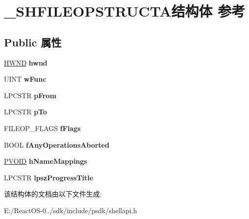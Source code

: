 \hypertarget{struct___s_h_f_i_l_e_o_p_s_t_r_u_c_t_a}{}\section{\+\_\+\+S\+H\+F\+I\+L\+E\+O\+P\+S\+T\+R\+U\+C\+T\+A结构体 参考}
\label{struct___s_h_f_i_l_e_o_p_s_t_r_u_c_t_a}
\subsection*{Public 属性}
\begin{DoxyCompactItemize}
\item 
\mbox{\label{struct___s_h_f_i_l_e_o_p_s_t_r_u_c_t_a_a41b6dc57bf84e71cfb875ce5ee901d2d}} 
\hyperlink{interfacevoid}{H\+W\+ND} {\bfseries hwnd}
\item 
\mbox{\label{struct___s_h_f_i_l_e_o_p_s_t_r_u_c_t_a_a8279a87684a461608231651724da2f92}} 
U\+I\+NT {\bfseries w\+Func}
\item 
\mbox{\label{struct___s_h_f_i_l_e_o_p_s_t_r_u_c_t_a_afe30a539d61ab33c50efc5815a92849d}} 
L\+P\+C\+S\+TR {\bfseries p\+From}
\item 
\mbox{\label{struct___s_h_f_i_l_e_o_p_s_t_r_u_c_t_a_abe74fd5f7b34398e26954e990dda5da2}} 
L\+P\+C\+S\+TR {\bfseries p\+To}
\item 
\mbox{\label{struct___s_h_f_i_l_e_o_p_s_t_r_u_c_t_a_ae027c5e4be79dca95ca7e70e78497312}} 
F\+I\+L\+E\+O\+P\+\_\+\+F\+L\+A\+GS {\bfseries f\+Flags}
\item 
\mbox{\label{struct___s_h_f_i_l_e_o_p_s_t_r_u_c_t_a_af7e413de77047a357d767140b7cc74d4}} 
B\+O\+OL {\bfseries f\+Any\+Operations\+Aborted}
\item 
\mbox{\label{struct___s_h_f_i_l_e_o_p_s_t_r_u_c_t_a_a2a6fa2c7f5a1b2b0cfba16999b72ba05}} 
\hyperlink{interfacevoid}{P\+V\+O\+ID} {\bfseries h\+Name\+Mappings}
\item 
\mbox{\label{struct___s_h_f_i_l_e_o_p_s_t_r_u_c_t_a_a64b38e559da3bf7441d0bbd1e99a6c75}} 
L\+P\+C\+S\+TR {\bfseries lpsz\+Progress\+Title}
\end{DoxyCompactItemize}


该结构体的文档由以下文件生成\+:\begin{DoxyCompactItemize}
\item 
E\+:/\+React\+O\+S-\/0../sdk/include/psdk/shellapi.\+h\end{DoxyCompactItemize}
